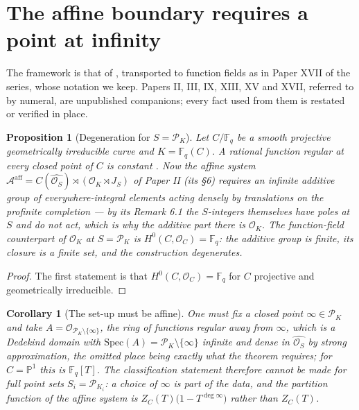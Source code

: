 \documentclass[11pt]{amsart}
\numberwithin{equation}{section}
\newtheorem{proposition}[theorem]{Proposition}
\newtheorem{corollary}[theorem]{Corollary}
\theoremstyle{definition}
\theoremstyle{remark}
\newcommand{\F}{\mathbb{F}}
\newcommand{\cA}{\mathcal{A}}
\newcommand{\cO}{\mathcal{O}}
\newcommand{\cP}{\mathcal{P}}
\begin{document}
\maketitle

\section{The affine boundary requires a point at infinity}

The framework is that of \cite{Main}, transported to function fields as in Paper XVII of the
series, whose notation we keep. Papers II, III, IX, XIII, XV and XVII, referred to by
numeral, are unpublished companions; every fact used from them is restated or verified in
place.

\begin{proposition}[Degeneration for $S=\cP_K$]\label{prop:infinity}
Let $C/\F_q$ be a smooth projective geometrically irreducible curve and $K=\F_q(C)$. A
rational function regular at every closed point of $C$ is constant \cite{Rosen}. Now the
affine system
$\cA^{\mathrm{aff}}=C(\widehat{\cO_S})\rtimes(\cO_K\rtimes J_S)$ of Paper II (its \S6)
requires an \emph{infinite} additive group of everywhere-integral elements acting densely by
translations on the profinite completion --- by its Remark 6.1 the $S$-integers themselves
have poles at $S$ and do not act, which is why the additive part there is $\cO_K$. The
function-field counterpart of $\cO_K$ at $S=\cP_K$ is $H^0(C,\cO_C)=\F_q$: the additive
group is finite, its closure is a finite set, and the construction degenerates.
\end{proposition}

\begin{proof}
The first statement is that $H^0(C,\cO_C)=\F_q$ for $C$ projective and geometrically
irreducible.
\end{proof}

\begin{corollary}[The set-up must be affine]\label{cor:affine}
One must fix a closed point $\infty\in\cP_K$ and take $A=\cO_{\cP_K\setminus\{\infty\}}$, the
ring of functions regular away from $\infty$, which is a Dedekind domain with
$\mathrm{Spec}(A)=\cP_K\setminus\{\infty\}$ infinite and dense in
$\widehat{\cO_S}$ by strong approximation, the omitted place being exactly what the theorem
requires; for $C=\mathbb P^1$ this is $\F_q[T]$.
The classification statement therefore cannot be made for full point sets
$S_i=\cP_{K_i}$: a choice of $\infty$ is part of the data, and the partition function of the
affine system is $Z_C(T)\bigl(1-T^{\deg\infty}\bigr)$ rather than $Z_C(T)$.
\end{corollary}
\end{document}
